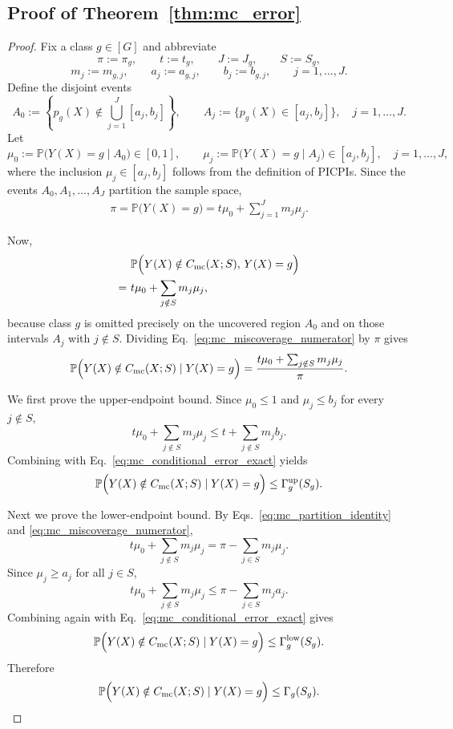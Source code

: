 \documentclass[11pt]{article}
\theoremstyle{statplain}
\theoremstyle{statdefinition}
\newcommand{\mc}{\mathrm{mc}}
\newcommand{\PP}{\mathbb{P}}
\newcommand{\0}{\mathbf{0}}
\newcommand{\numClass}{G} %
\newcommand{\iteratorClass}{g}
\newcommand{\titleShorts}{PICPIs\xspace}
\begin{document}
\subsection{Proof of Theorem~\ref{thm:mc_error}}
\label{proof_thm:mc_error}


\begin{proof}
Fix a class $\iteratorClass\in[\numClass]$ and abbreviate
\[
\pi:=\pi_\iteratorClass,\qquad
t:=t_\iteratorClass,\qquad
J:=J_\iteratorClass,\qquad
S:=S_\iteratorClass,
\]
\[
m_j:=m_{\iteratorClass,j},\qquad
a_j:=a_{\iteratorClass,j},\qquad
b_j:=b_{\iteratorClass,j},
\qquad j=1,\ldots,J.
\]
Define the disjoint events
\[
A_0
:=
\left\{
p_\iteratorClass(X)\notin \bigcup_{j=1}^{J}[a_j,b_j]
\right\},
\qquad
A_j
:=
\bigl\{
p_\iteratorClass(X)\in [a_j,b_j]
\bigr\},
\quad j=1,\ldots,J.
\]
Let
\[
\mu_0
:=
\PP\bigl(Y(X)=\iteratorClass \mid A_0\bigr)\in[0,1],
\qquad
\mu_j
:=
\PP\bigl(Y(X)=\iteratorClass \mid A_j\bigr)\in[a_j,b_j],
\quad j=1,\ldots,J,
\]
where the inclusion $\mu_j\in[a_j,b_j]$ follows from the definition of \titleShorts.
Since the events $A_0,A_1,\ldots,A_J$ partition the sample space,
\begin{align}
\pi
=
\PP\bigl(Y(X)=\iteratorClass\bigr)
=
t\mu_0+\sum_{j=1}^{J} m_j\mu_j.
\label{eq:mc_partition_identity}
\end{align}

Now,
\begin{align}
&~\PP\Bigl(Y(X)\notin C_{\mc}(X;S),\,Y(X)=\iteratorClass\Bigr)
\nonumber\\
=
&~t\mu_0+\sum_{j\notin S} m_j\mu_j,
\label{eq:mc_miscoverage_numerator}
\end{align}
because class $\iteratorClass$ is omitted precisely on the uncovered region $A_0$ and on those intervals $A_j$ with $j\notin S$.
Dividing Eq.~\eqref{eq:mc_miscoverage_numerator} by $\pi$ gives
\begin{align}
\PP\Bigl(Y(X)\notin C_{\mc}(X;S)\mid Y(X)=\iteratorClass\Bigr)
=
\frac{t\mu_0+\sum_{j\notin S} m_j\mu_j}{\pi}.
\label{eq:mc_conditional_error_exact}
\end{align}

We first prove the upper-endpoint bound.
Since $\mu_0\le 1$ and $\mu_j\le b_j$ for every $j\notin S$,
\[
t\mu_0+\sum_{j\notin S} m_j\mu_j
\le
t+\sum_{j\notin S} m_j b_j.
\]
Combining with Eq.~\eqref{eq:mc_conditional_error_exact} yields
\[
\PP\Bigl(Y(X)\notin C_{\mc}(X;S)\mid Y(X)=\iteratorClass\Bigr)
\le
\Gamma_{\iteratorClass}^{\mathrm{up}}(S_\iteratorClass).
\]

Next we prove the lower-endpoint bound.
By Eqs.~\eqref{eq:mc_partition_identity} and \eqref{eq:mc_miscoverage_numerator},
\[
t\mu_0+\sum_{j\notin S} m_j\mu_j
=
\pi-\sum_{j\in S} m_j\mu_j.
\]
Since $\mu_j\ge a_j$ for all $j\in S$,
\[
t\mu_0+\sum_{j\notin S} m_j\mu_j
\le
\pi-\sum_{j\in S} m_j a_j.
\]
Combining again with Eq.~\eqref{eq:mc_conditional_error_exact} gives
\[
\PP\Bigl(Y(X)\notin C_{\mc}(X;S)\mid Y(X)=\iteratorClass\Bigr)
\le
\Gamma_{\iteratorClass}^{\mathrm{low}}(S_\iteratorClass).
\]
Therefore
\[
\PP\Bigl(Y(X)\notin C_{\mc}(X;S)\mid Y(X)=\iteratorClass\Bigr)
\le
\Gamma_{\iteratorClass}(S_\iteratorClass).
\]


\end{proof}
\end{document}
